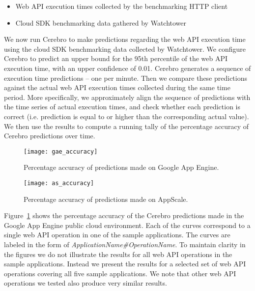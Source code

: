 \begin{itemize}
\item Web API execution times collected by the benchmarking HTTP client
\item Cloud SDK benchmarking data gathered by Watchtower
\end{itemize}

We now run Cerebro to make predictions regarding the web API execution time using the cloud SDK benchmarking data
collected by Watchtower. We configure Cerebro to predict an upper bound for the 95th percentile of the web API
execution time, with an upper confidence of 0.01. Cerebro generates a sequence of execution time predictions -- one 
per minute. Then we compare these predictions against the actual web API execution times collected during the same
time period. More specifically, we approximately align the sequence of predictions with the time series of actual execution
times, and check whether each prediction is correct (i.e. prediction is equal to or higher than the
corresponding actual value). We then use the results to compute a running tally of the percentage accuracy of Cerebro
predictions over time.

\begin{figure}
\centering
\texttt{[image: gae\_accuracy]}
\caption{Percentage accuracy of predictions made on Google App Engine.}
\label{fig:gae_accuracy}
\end{figure}

\begin{figure}
\centering
\texttt{[image: as\_accuracy]}
\caption{Percentage accuracy of predictions made on AppScale.}
\label{fig:as_accuracy}
\end{figure}

Figure~\ref{fig:gae_accuracy} shows the percentage accuracy of the Cerebro predictions made in the Google App Engine 
public cloud environment. Each of the curves correspond to a single web API operation in one of the sample applications. 
The curves are labeled in the form of \textit{ApplicationName\#OperationName}. To maintain clarity in the figures we do not 
illustrate the results for all web API operations in the sample applications. Instead we present the results for a selected set of 
web API operations covering all five sample applications. We note that other web API operations we tested also produce
very similar results.

